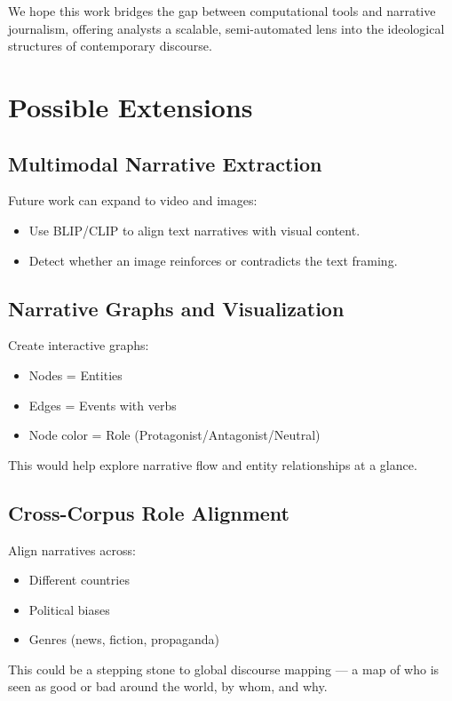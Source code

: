 \documentclass[12pt]{article}
\begin{document}
We hope this work bridges the gap between computational tools and narrative journalism, offering analysts a scalable, semi-automated lens into the ideological structures of contemporary discourse.

\section{Possible Extensions}

\subsection{Multimodal Narrative Extraction}

Future work can expand to video and images:
\begin{itemize}
    \item Use BLIP/CLIP to align text narratives with visual content.
    \item Detect whether an image reinforces or contradicts the text framing.
\end{itemize}

\subsection{Narrative Graphs and Visualization}

Create interactive graphs:
\begin{itemize}
    \item Nodes = Entities
    \item Edges = Events with verbs
    \item Node color = Role (Protagonist/Antagonist/Neutral)
\end{itemize}
This would help explore narrative flow and entity relationships at a glance.

\subsection{Cross-Corpus Role Alignment}

Align narratives across:
\begin{itemize}
    \item Different countries
    \item Political biases
    \item Genres (news, fiction, propaganda)
\end{itemize}

This could be a stepping stone to global discourse mapping — a map of who is seen as good or bad around the world, by whom, and why.
\end{document}
